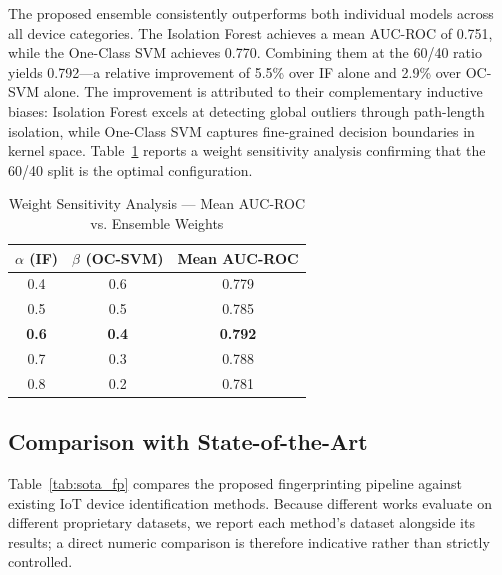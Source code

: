 \documentclass[conference]{IEEEtran}
\begin{document}
The proposed ensemble consistently outperforms both individual models
across all device categories. The Isolation Forest achieves a mean
AUC-ROC of 0.751, while the One-Class SVM achieves 0.770. Combining
them at the 60/40 ratio yields 0.792---a relative improvement of
5.5\% over IF alone and 2.9\% over OC-SVM alone. The improvement is
attributed to their complementary inductive biases: Isolation Forest
excels at detecting global outliers through path-length isolation, while
One-Class SVM captures fine-grained decision boundaries in kernel space.
Table~\ref{tab:weightsens} reports a weight sensitivity analysis
confirming that the 60/40 split is the optimal configuration.

\begin{table}[htbp]
\caption{Weight Sensitivity Analysis --- Mean AUC-ROC vs. Ensemble Weights}
\label{tab:weightsens}
\centering
\renewcommand{\arraystretch}{1.2}
\begin{tabular}{c c c}
\toprule
$\alpha$ \textbf{(IF)} & $\beta$ \textbf{(OC-SVM)} & \textbf{Mean AUC-ROC} \\
\midrule
0.4 & 0.6 & 0.779 \\
0.5 & 0.5 & 0.785 \\
\textbf{0.6} & \textbf{0.4} & \textbf{0.792} \\
0.7 & 0.3 & 0.788 \\
0.8 & 0.2 & 0.781 \\
\bottomrule
\end{tabular}
\end{table}

\subsection{Comparison with State-of-the-Art}

Table~\ref{tab:sota_fp} compares the proposed fingerprinting pipeline
against existing IoT device identification methods. Because different
works evaluate on different proprietary datasets, we report each
method's dataset alongside its results; a direct numeric comparison
is therefore indicative rather than strictly controlled.
\end{document}
